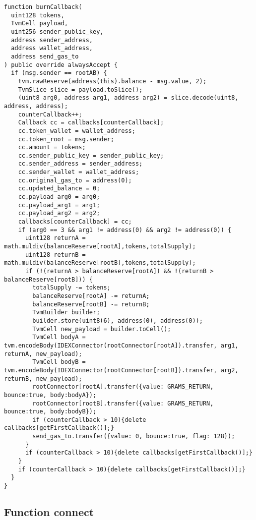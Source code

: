 \begin{lstlisting}[firstnumber=522]
function burnCallback(
  uint128 tokens,
  TvmCell payload,
  uint256 sender_public_key,
  address sender_address,
  address wallet_address,
  address send_gas_to
) public override alwaysAccept {
  if (msg.sender == rootAB) {
    tvm.rawReserve(address(this).balance - msg.value, 2);
    TvmSlice slice = payload.toSlice();
    (uint8 arg0, address arg1, address arg2) = slice.decode(uint8, address, address);
    counterCallback++;
    Callback cc = callbacks[counterCallback];
    cc.token_wallet = wallet_address;
    cc.token_root = msg.sender;
    cc.amount = tokens;
    cc.sender_public_key = sender_public_key;
    cc.sender_address = sender_address;
    cc.sender_wallet = wallet_address;
    cc.original_gas_to = address(0);
    cc.updated_balance = 0;
    cc.payload_arg0 = arg0;
    cc.payload_arg1 = arg1;
    cc.payload_arg2 = arg2;
    callbacks[counterCallback] = cc;
    if (arg0 == 3 && arg1 != address(0) && arg2 != address(0)) {
      uint128 returnA = math.muldiv(balanceReserve[rootA],tokens,totalSupply);
      uint128 returnB = math.muldiv(balanceReserve[rootB],tokens,totalSupply);
      if (!(returnA > balanceReserve[rootA]) && !(returnB > balanceReserve[rootB])) {
        totalSupply -= tokens;
        balanceReserve[rootA] -= returnA;
        balanceReserve[rootB] -= returnB;
        TvmBuilder builder;
        builder.store(uint8(6), address(0), address(0));
        TvmCell new_payload = builder.toCell();
        TvmCell bodyA = tvm.encodeBody(IDEXConnector(rootConnector[rootA]).transfer, arg1, returnA, new_payload);
        TvmCell bodyB = tvm.encodeBody(IDEXConnector(rootConnector[rootB]).transfer, arg2, returnB, new_payload);
        rootConnector[rootA].transfer({value: GRAMS_RETURN, bounce:true, body:bodyA});
        rootConnector[rootB].transfer({value: GRAMS_RETURN, bounce:true, body:bodyB});
        if (counterCallback > 10){delete callbacks[getFirstCallback()];}
        send_gas_to.transfer({value: 0, bounce:true, flag: 128});
      }
      if (counterCallback > 10){delete callbacks[getFirstCallback()];}
    }
    if (counterCallback > 10){delete callbacks[getFirstCallback()];}
  }
}
\end{lstlisting}

\subsection{Function connect}

\vspace{2cm}

